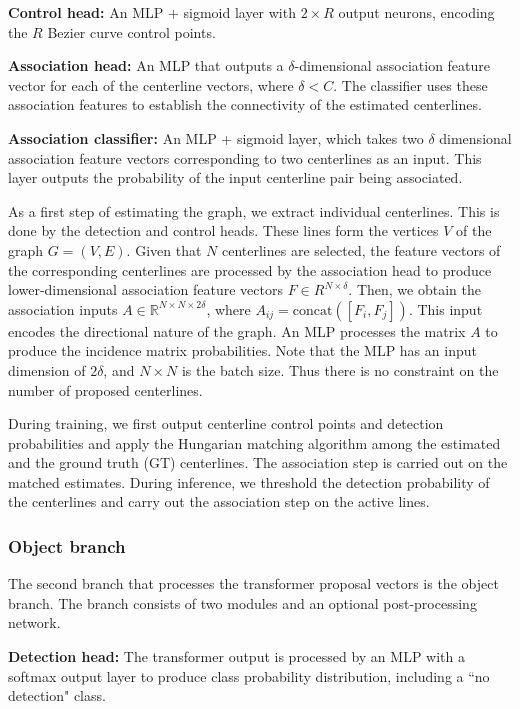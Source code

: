 \documentclass[10pt,twocolumn,letterpaper]{article}
\begin{document}
\noindent\textbf{Control head:} An MLP + sigmoid layer with $2\times R$ output neurons, encoding the $R$ Bezier curve control points.

\noindent\textbf{Association head:} An MLP that outputs a $\delta$-dimensional association feature vector for each of the centerline vectors, where $\delta < C$. The classifier uses these association features to establish the connectivity of the estimated centerlines.   

\noindent\textbf{Association classifier:} An MLP + sigmoid layer, which takes two $\delta$ dimensional association feature vectors corresponding to two centerlines as an input. This layer outputs the probability of the input centerline pair being associated.   

As a first step of estimating the graph, we extract individual centerlines. This is done by the detection and control heads. These lines form the vertices $V$ of the graph $G = (V, E)$. Given that $N$ centerlines are selected, the feature vectors of the corresponding centerlines are processed by the association head to produce lower-dimensional association feature vectors $F \in  \!R^{N \times \delta}$. Then, we obtain the association inputs $A \in \!\mathbb{R}^{N \times N \times 2\delta}$, where $A_{ij} = \text{concat}([F_i, F_j]) $. This input encodes the directional nature of the graph. An MLP processes the matrix $A$ to produce the incidence matrix probabilities. Note that the MLP has an input dimension of $2\delta$, and $N \times N$ is the batch size. Thus there is no constraint on the number of proposed centerlines.


During training, we first output centerline control points and detection probabilities and apply the Hungarian matching algorithm among the estimated  and the ground truth (GT) centerlines. The association step is carried out on the matched estimates. During inference, we threshold the detection probability of the centerlines and carry out the association step on the active lines.

\subsubsection{Object branch}
The second branch that processes the transformer proposal vectors is the object branch. The branch consists of two modules and an optional post-processing network.

\noindent\textbf{Detection head:} The transformer output is processed by an MLP with a softmax output layer to produce class probability distribution, including a ``no detection" class.  
\end{document}

